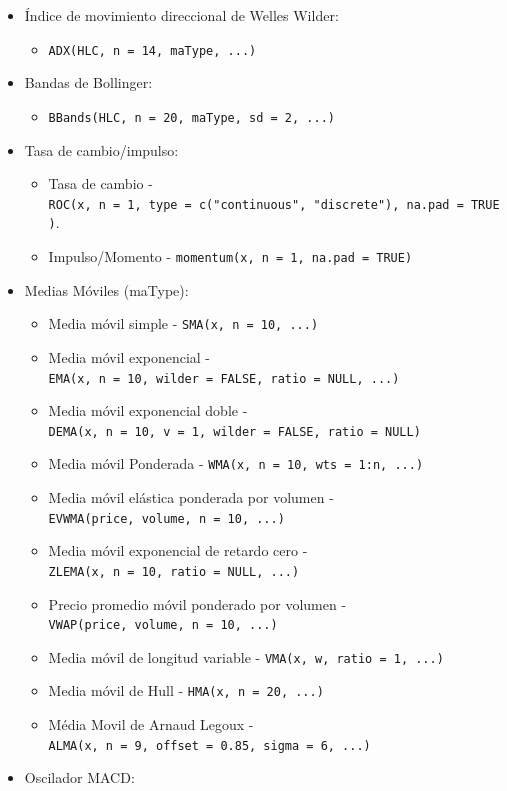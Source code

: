 \documentclass[
]{book}
\providecommand{\tightlist}{%
  \setlength{\itemsep}{0pt}\setlength{\parskip}{0pt}}
\begin{document}
\begin{itemize}
\tightlist
\item
  Índice de movimiento direccional de Welles Wilder:

  \begin{itemize}
  \tightlist
  \item
    \texttt{ADX(HLC,\ n\ =\ 14,\ maType,\ ...)}
  \end{itemize}
\item
  Bandas de Bollinger:

  \begin{itemize}
  \tightlist
  \item
    \texttt{BBands(HLC,\ n\ =\ 20,\ maType,\ sd\ =\ 2,\ ...)}
  \end{itemize}
\item
  Tasa de cambio/impulso:

  \begin{itemize}
  \tightlist
  \item
    Tasa de cambio - \texttt{ROC(x,\ n\ =\ 1,\ type\ =\ c("continuous",\ "discrete"),\ na.pad\ =\ TRUE)}.
  \item
    Impulso/Momento - \texttt{momentum(x,\ n\ =\ 1,\ na.pad\ =\ TRUE)}
  \end{itemize}
\item
  Medias Móviles (maType):

  \begin{itemize}
  \tightlist
  \item
    Media móvil simple - \texttt{SMA(x,\ n\ =\ 10,\ ...)}
  \item
    Media móvil exponencial - \texttt{EMA(x,\ n\ =\ 10,\ wilder\ =\ FALSE,\ ratio\ =\ NULL,\ ...)}
  \item
    Media móvil exponencial doble - \texttt{DEMA(x,\ n\ =\ 10,\ v\ =\ 1,\ wilder\ =\ FALSE,\ ratio\ =\ NULL)}
  \item
    Media móvil Ponderada - \texttt{WMA(x,\ n\ =\ 10,\ wts\ =\ 1:n,\ ...)}
  \item
    Media móvil elástica ponderada por volumen - \texttt{EVWMA(price,\ volume,\ n\ =\ 10,\ ...)}
  \item
    Media móvil exponencial de retardo cero - \texttt{ZLEMA(x,\ n\ =\ 10,\ ratio\ =\ NULL,\ ...)}
  \item
    Precio promedio móvil ponderado por volumen - \texttt{VWAP(price,\ volume,\ n\ =\ 10,\ ...)}
  \item
    Media móvil de longitud variable - \texttt{VMA(x,\ w,\ ratio\ =\ 1,\ ...)}
  \item
    Media móvil de Hull - \texttt{HMA(x,\ n\ =\ 20,\ ...)}
  \item
    Média Movil de Arnaud Legoux - \texttt{ALMA(x,\ n\ =\ 9,\ offset\ =\ 0.85,\ sigma\ =\ 6,\ ...)}
  \end{itemize}
\item
  Oscilador MACD:


\end{itemize}
\end{document}
